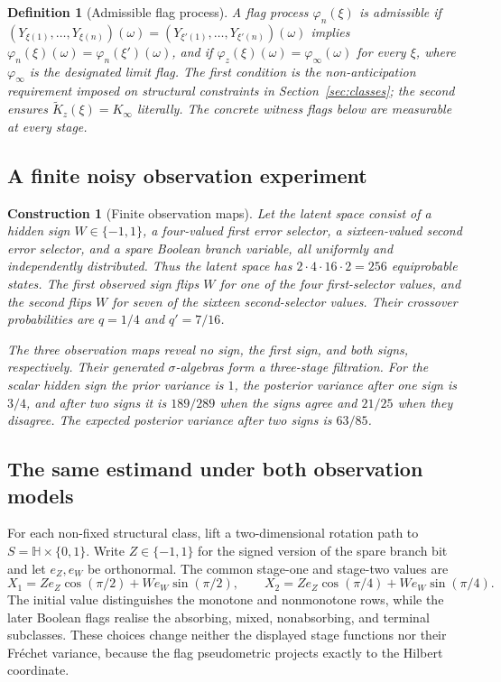 \documentclass{article}
\newcommand{\1}{\mathbbm{1}}
\newtheorem{definition}{Definition}
\newtheorem{construction}{Construction}
\begin{document}
\begin{definition}[Admissible flag process]
\label{flagadmissible}
A flag process $\varphi_n(\xi)$ is \emph{admissible} if
$(Y_{\xi(1)},\dots,Y_{\xi(n)})(\omega)=(Y_{\xi'(1)},\dots,Y_{\xi'(n)})(\omega)$ implies
$\varphi_n(\xi)(\omega)=\varphi_n(\xi')(\omega)$, and if
$\varphi_z(\xi)(\omega)=\varphi_\infty(\omega)$ for every $\xi$, where $\varphi_\infty$ is the
designated limit flag. The first condition is the non-anticipation requirement imposed on
structural constraints in Section~\ref{sec:classes}; the second ensures
$\widetilde K_z(\xi)=K_\infty$ literally. The concrete witness flags below are measurable at every
stage.
\end{definition}

\subsection*{A finite noisy observation experiment}

\begin{construction}[Finite observation maps]
\label{obsmaps}
Let the latent space consist of a hidden sign $W\in\{-1,1\}$, a four-valued first error selector,
a sixteen-valued second error selector, and a spare Boolean branch variable, all uniformly and
independently distributed. Thus the latent space has $2\cdot4\cdot16\cdot2=256$ equiprobable
states. The first observed sign flips $W$ for one of the four first-selector values, and the second
flips $W$ for seven of the sixteen second-selector values. Their crossover probabilities are
$q=1/4$ and $q'=7/16$.

The three observation maps reveal no sign, the first sign, and both signs, respectively. Their
generated $\sigma$-algebras form a three-stage filtration. For the scalar hidden sign the prior
variance is $1$, the posterior variance after one sign is $3/4$, and after two signs it is
$189/289$ when the signs agree and $21/25$ when they disagree. The expected posterior variance
after two signs is $63/85$.
\end{construction}

\subsection*{The same estimand under both observation models}

For each non-fixed structural class, lift a two-dimensional rotation path to
$S=\mathbb H\times\{0,1\}$.  Write $Z\in\{-1,1\}$ for the signed version of the spare branch bit
and let $e_Z,e_W$ be orthonormal.  The common stage-one and stage-two values are
\[
X_1=Z e_Z\cos(\pi/2)+W e_W\sin(\pi/2),\qquad
X_2=Z e_Z\cos(\pi/4)+W e_W\sin(\pi/4).
\]
The initial value distinguishes the monotone and nonmonotone rows, while the later Boolean flags
realise the absorbing, mixed, nonabsorbing, and terminal subclasses.  These choices change neither
the displayed stage functions nor their Fr\'echet variance, because the flag pseudometric projects
exactly to the Hilbert coordinate.
\end{document}
